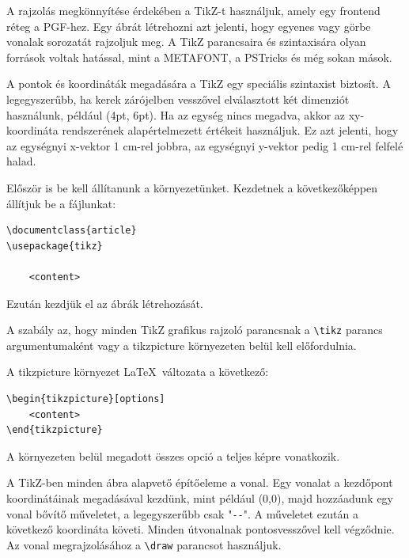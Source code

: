 


A rajzolás megkönnyítése érdekében a TikZ-t használjuk, amely egy frontend réteg a PGF-hez. Egy ábrát létrehozni azt jelenti, hogy egyenes vagy görbe vonalak sorozatát rajzoljuk meg. A TikZ parancsaira és szintaxisára olyan források voltak hatással, mint a METAFONT, a PSTricks és még sokan mások.

\noindent
A pontok és koordináták megadására a TikZ egy speciális szintaxist biztosít. A legegyszerűbb, ha kerek zárójelben vesszővel elválasztott két dimenziót használunk, például (4pt, 6pt). Ha az egység nincs megadva, akkor az xy-koordináta rendszerének alapértelmezett értékeit használjuk. Ez azt jelenti, hogy az egységnyi x-vektor 1 cm-rel jobbra, az egységnyi y-vektor pedig 1 cm-rel felfelé halad. 



Először is be kell állítanunk a környezetünket. Kezdetnek a következőképpen állítjuk be a fájlunkat:

\begin{lstlisting}[style=latex]
\documentclass{article}
\usepackage{tikz}

	<content>

\end{lstlisting}

\noindent
Ezután kezdjük el az ábrák létrehozását. 



A szabály az, hogy minden TikZ grafikus rajzoló parancsnak a \lstinline{\tikz} parancs argumentumaként vagy a {tikzpicture} környezeten belül kell előfordulnia. 

\noindent
A {tikzpicture} környezet \LaTeX\ változata a következő:

\begin{lstlisting}[style=latex]
\begin{tikzpicture}[options]
	<content>
\end{tikzpicture}
\end{lstlisting}


\noindent
A környezeten belül megadott összes opció a teljes képre vonatkozik.

\noindent
A TikZ-ben minden ábra alapvető építőeleme a vonal. Egy vonalat a kezdőpont koordinátáinak megadásával kezdünk, mint például (0,0), majd hozzáadunk egy vonal bővítő műveletet, a legegyszerűbb csak "\lstinline{--}". A műveletet ezután a következő koordináta követi. Minden útvonalnak pontosvesszővel kell végződnie. Az vonal megrajzolásához a \lstinline{\draw} parancsot használjuk.


